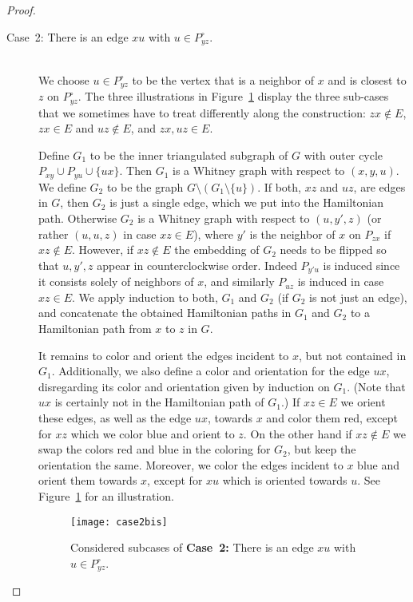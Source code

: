 \documentclass[a4paper,10pt]{article}
\theoremstyle{plain}
\newcommand{\inner}[1]{{#1}^{\circ}}
\begin{document}
\begin{proof}
\begin{description}
  \item[Case~2: There is an edge $xu$ with $u \in \inner{P}_{yz}$.]{\ \\}  
   We choose $u \in \inner{P}_{yz}$ to be the vertex that is a neighbor of $x$ and is closest to $z$ on $\inner{P}_{yz}$. The three illustrations in Figure~\ref{fig:case2} display the three sub-cases that we sometimes have to treat differently along the construction: $zx\notin E$,  $zx\in E$ and $uz\notin E$, and $zx,uz\in E$.
 
   Define $G_1$ to be the inner triangulated subgraph of $G$ with outer cycle $P_{xy} \cup P_{yu} \cup \{ux\}$. Then $G_1$ is a Whitney graph with respect to $(x,y,u)$. We define $G_2$ to be the graph $G \setminus (G_1 \setminus \{u\})$. If both, $xz$ and $uz$, are edges in $G$, then $G_2$ is just a single edge, which we put into the Hamiltonian path. Otherwise $G_2$ is a Whitney graph with respect to $(u,y',z)$ (or rather $(u,u,z)$ in case $xz \in E$), where $y'$ is the neighbor of $x$ on $P_{zx}$ if $xz \notin E$. However, if $xz \notin E$ the embedding of $G_2$ needs to be flipped so that $u,y',z$ appear in counterclockwise order. Indeed $P_{y'u}$ is induced since it consists solely of neighbors of $x$, and similarly $P_{uz}$ is induced in case $xz \in E$. We apply induction to both, $G_1$ and $G_2$ (if $G_2$ is not just an edge), and concatenate the obtained Hamiltonian paths in $G_1$ and $G_2$ to a Hamiltonian path from $x$ to $z$ in $G$.
 
   It remains to color and orient the edges incident to $x$, but not contained in $G_1$. Additionally, we also define a color and orientation for the edge $ux$, disregarding its color and orientation given by induction on $G_1$. (Note that $ux$ is certainly not in the Hamiltonian path of $G_1$.) If $xz \in E$ we orient these edges, as well as the edge $ux$, towards $x$ and color them red, except for $xz$ which we color blue and orient to $z$. On the other hand if $xz \notin E$ we swap the colors red and blue in the coloring for $G_2$, but keep the orientation the same. Moreover, we color the edges incident to $x$ blue and orient them towards $x$, except for $xu$ which is oriented towards $u$. See Figure~\ref{fig:case2} for an illustration.
 
   \begin{figure}[tb]
    \centering
    \texttt{[image: case2bis]}
    \caption{Considered subcases of \textbf{Case~2:} There is an edge $xu$ with $u \in \inner{P}_{yz}$.}
    \label{fig:case2}
   \end{figure}
 

\end{description}
\end{proof}
\end{document}
